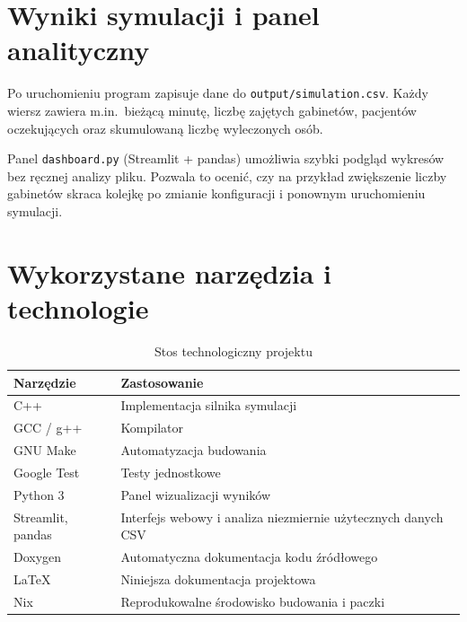 \documentclass[12pt,a4paper]{article}
\begin{document}
\section{Wyniki symulacji i panel analityczny}

Po uruchomieniu program zapisuje dane do \texttt{output/simulation.csv}. Każdy wiersz
zawiera m.in.\ bieżącą minutę, liczbę zajętych gabinetów, pacjentów oczekujących
oraz skumulowaną liczbę wyleczonych osób.

Panel \texttt{dashboard.py} (Streamlit + pandas) umożliwia szybki podgląd wykresów
bez ręcznej analizy pliku. Pozwala to ocenić, czy na przykład zwiększenie liczby
gabinetów skraca kolejkę po zmianie konfiguracji i ponownym uruchomieniu symulacji.

\section{Wykorzystane narzędzia i technologie}

\begin{table}[H]
	\centering
	\caption{Stos technologiczny projektu}
	\begin{tabular}{@{}lp{9cm}@{}}
		\toprule
		Narzędzie         & Zastosowanie                                                  \\
		\midrule
		C++               & Implementacja silnika symulacji                               \\
		GCC / g++         & Kompilator                                                    \\
		GNU Make          & Automatyzacja budowania                                       \\
		Google Test       & Testy jednostkowe                                             \\
		Python 3          & Panel wizualizacji wyników                                    \\
		Streamlit, pandas & Interfejs webowy i analiza niezmiernie użytecznych danych CSV \\
		Doxygen           & Automatyczna dokumentacja kodu źródłowego                     \\
		\LaTeX            & Niniejsza dokumentacja projektowa                             \\
		Nix               & Reprodukowalne środowisko budowania i paczki                  \\
		\bottomrule
	\end{tabular}
\end{table}
\end{document}
